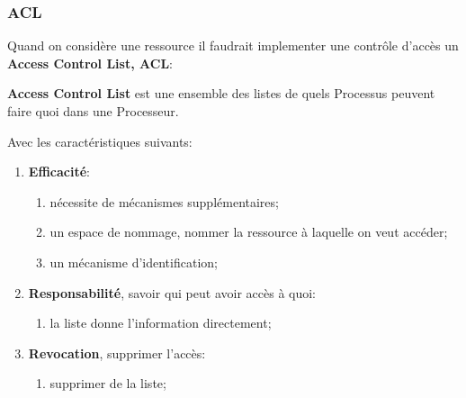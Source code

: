 \documentclass{article}
\begin{document}
\subsubsection*{ACL}
Quand on considère une ressource il faudrait implementer une contrôle d'accès un \textbf{Access Control List, ACL}:
\begin{definition}
    \textbf{Access Control List} est une ensemble des listes de quels Processus peuvent faire quoi dans une Processeur.
\end{definition}
Avec les caractéristiques suivants:
\begin{enumerate}
    \item \textbf{Efficacité}:
    \begin{enumerate}[noitemsep]
        \item nécessite de mécanismes supplémentaires;
        \item un espace de nommage, nommer la ressource à laquelle on veut accéder;
        \item un mécanisme d'identification;
    \end{enumerate}

    \item \textbf{Responsabilité}, savoir qui peut avoir accès à quoi:
    \begin{enumerate}[noitemsep]
        \item la liste donne l'information directement;
    \end{enumerate}

    \item \textbf{Revocation}, supprimer l'accès:
    \begin{enumerate}[noitemsep]
        \item supprimer de la liste;
    \end{enumerate}
\end{enumerate}
\end{document}
